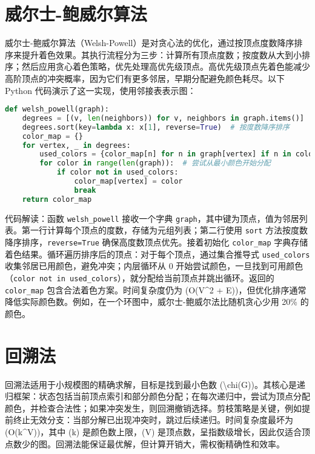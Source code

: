 \chapter{威尔士-鲍威尔算法}
威尔士-鲍威尔算法（Welsh-Powell）是对贪心法的优化，通过按顶点度数降序排序来提升着色效果。其执行流程分为三步：计算所有顶点度数；按度数从大到小排序；然后应用贪心着色策略，优先处理高优先级顶点。高优先级顶点先着色能减少高阶顶点的冲突概率，因为它们有更多邻居，早期分配避免颜色耗尽。以下 Python 代码演示了这一实现，使用邻接表表示图：\par
\begin{lstlisting}[language=python]
def welsh_powell(graph):
    degrees = [(v, len(neighbors)) for v, neighbors in graph.items()]
    degrees.sort(key=lambda x: x[1], reverse=True)  # 按度数降序排序
    color_map = {}
    for vertex, _ in degrees:
        used_colors = {color_map[n] for n in graph[vertex] if n in color_map}  # 收集邻居已用颜色
        for color in range(len(graph)):  # 尝试从最小颜色开始分配
            if color not in used_colors:
                color_map[vertex] = color
                break
    return color_map
\end{lstlisting}
代码解读：函数 \texttt{welsh\_{}powell} 接收一个字典 \texttt{graph}，其中键为顶点，值为邻居列表。第一行计算每个顶点的度数，存储为元组列表；第二行使用 \texttt{sort} 方法按度数降序排序，\texttt{reverse=True} 确保高度数顶点优先。接着初始化 \texttt{color\_{}map} 字典存储着色结果。循环遍历排序后的顶点：对于每个顶点，通过集合推导式 \texttt{used\_{}colors} 收集邻居已用颜色，避免冲突；内层循环从 0 开始尝试颜色，一旦找到可用颜色（\texttt{color not in used\_{}colors}），就分配给当前顶点并跳出循环。返回的 \texttt{color\_{}map} 包含合法着色方案。时间复杂度仍为 (O(V\^{}2 + E))，但优化排序通常降低实际颜色数。例如，在一个环图中，威尔士-鲍威尔法比随机贪心少用 20\%{} 的颜色。\par
\chapter{回溯法}
回溯法适用于小规模图的精确求解，目标是找到最小色数 (\textbackslash{}chi(G))。其核心是递归框架：状态包括当前顶点索引和部分颜色分配；在每次递归中，尝试为顶点分配颜色，并检查合法性；如果冲突发生，则回溯撤销选择。剪枝策略是关键，例如提前终止无效分支：当部分解已出现冲突时，跳过后续递归。时间复杂度最坏为 (O(k\^{}V))，其中 (k) 是颜色数上限，(V) 是顶点数，呈指数级增长，因此仅适合顶点数少的图。回溯法能保证最优解，但计算开销大，需权衡精确性和效率。\par
